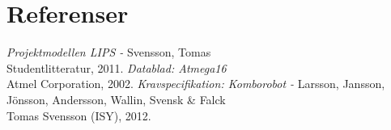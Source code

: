 %

\section{Referenser}
\begin{thebibliography}{99}
\textit{Projektmodellen LIPS - } Svensson, Tomas
\\Studentlitteratur, 2011.
\textit{Datablad: Atmega16}
\\Atmel Corporation, 2002.
\textit{Kravspecifikation: Komborobot - } Larsson, Jansson, Jönsson, Andersson, Wallin, Svensk \& Falck
\\Tomas Svensson (ISY), 2012.
\end{thebibliography}
 